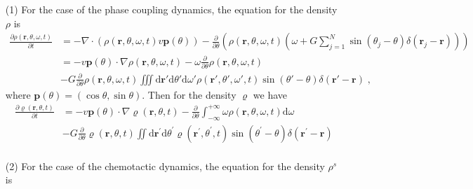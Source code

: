 \documentclass{article}
\begin{document}
\begin{enumerate}
    \item[(1)] For the case of the phase coupling dynamics, the equation for the density $\rho$ is
    \begin{equation}
        \begin{aligned}
            \frac{\partial \rho \left( \mathbf{r},\theta ,\omega ,t \right)}{\partial t}&=-\nabla \cdot \left( \rho \left( \mathbf{r},\theta ,\omega ,t \right) v\mathbf{p}\left( \theta \right) \right) -\frac{\partial}{\partial \theta}\left( \rho \left( \mathbf{r},\theta ,\omega ,t \right) \left( \omega +G\sum_{j=1}^N{\sin \left( \theta _j-\theta \right) \delta \left( \mathbf{r}_j-\mathbf{r} \right)} \right) \right)\\
            &=-v\mathbf{p}\left( \theta \right) \cdot \nabla \rho \left( \mathbf{r},\theta ,\omega ,t \right) -\omega \frac{\partial}{\partial \theta}\rho \left( \mathbf{r},\theta ,\omega ,t \right) \\
            &-G\frac{\partial}{\partial \theta}\rho \left( \mathbf{r},\theta ,\omega ,t \right) \iiint{\text{d}\mathbf{r}'\text{d}\theta '\text{d}\omega '\rho \left( \mathbf{r}',\theta ',\omega ',t \right) \sin \left( \theta '-\theta \right) \delta \left( \mathbf{r}'-\mathbf{r} \right)}\;,
        \end{aligned}
    \end{equation}
    where $\mathbf{p}\left( \theta \right) =\left( \cos \theta ,\sin \theta \right)$. Then for the density $\varrho$ we have
    \begin{equation}
        \label{eq:coarseDensityAlign}
        \begin{aligned}
            \frac{\partial \varrho \left( \mathbf{r},\theta ,t \right)}{\partial t}&=-v\mathbf{p}\left( \theta \right) \cdot \nabla \varrho \left( \mathbf{r},\theta ,t \right) -\frac{\partial}{\partial \theta}\int_{-\infty}^{+\infty}{\omega \rho \left( \mathbf{r},\theta ,\omega ,t \right) \mathrm{d}\omega}\\
            &-G\frac{\partial}{\partial \theta}\varrho \left( \mathbf{r},\theta ,t \right) \iint{\mathrm{d}\mathbf{r}^{\prime}\mathrm{d}\theta^{\prime}\varrho \left( \mathbf{r}^{\prime},\theta^{\prime},t \right) \sin \left( \theta^{\prime}-\theta \right) \delta \left( \mathbf{r}^{\prime}-\mathbf{r} \right)}\\
        \end{aligned}
    \end{equation}
    \item[(2)] For the case of the chemotactic dynamics, the equation for the density $\rho^s$ is

\end{enumerate}
\end{document}
